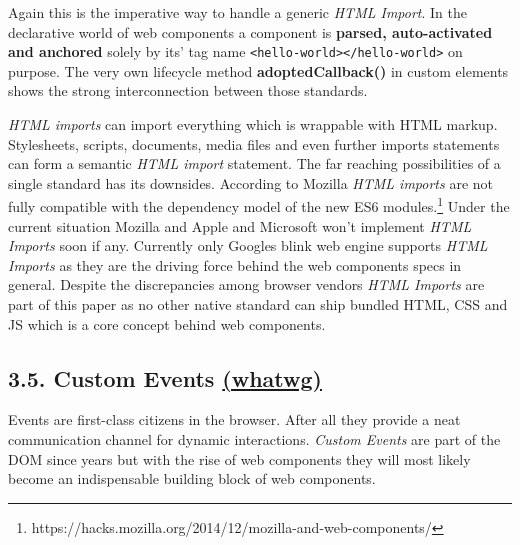 \documentclass[]{article}
\begin{document}
Again this is the imperative way to handle a generic \emph{HTML Import}.
In the declarative world of web components a component is
\textbf{parsed, auto-activated and anchored} solely by its' tag name
\texttt{\textless{}hello-world\textgreater{}\textless{}/hello-world\textgreater{}}
on purpose. The very own lifecycle method \textbf{adoptedCallback()} in
custom elements shows the strong interconnection between those
standards.

\emph{HTML imports} can import everything which is wrappable with HTML
markup. Stylesheets, scripts, documents, media files and even further
imports statements can form a semantic \emph{HTML import} statement. The
far reaching possibilities of a single standard has its downsides.
According to Mozilla \emph{HTML imports} are not fully compatible with
the dependency model of the new ES6 modules.\footnote{https://hacks.mozilla.org/2014/12/mozilla-and-web-components/}
Under the current situation Mozilla and Apple and Microsoft won't
implement \emph{HTML Imports} soon if any. Currently only Googles blink
web engine supports \emph{HTML Imports} as they are the driving force
behind the web components specs in general. Despite the discrepancies
among browser vendors \emph{HTML Imports} are part of this paper as no
other native standard can ship bundled HTML, CSS and JS which is a core
concept behind web components.

\subsection{\texorpdfstring{3.5. Custom Events
\href{https://dom.spec.whatwg.org/\#interface-customevent}{(whatwg)}}{3.5. Custom Events (whatwg)}}\label{custom-events-whatwg}

Events are first-class citizens in the browser. After all they provide a
neat communication channel for dynamic interactions. \emph{Custom
Events} are part of the DOM since years but with the rise of web
components they will most likely become an indispensable building block
of web components.
\end{document}
